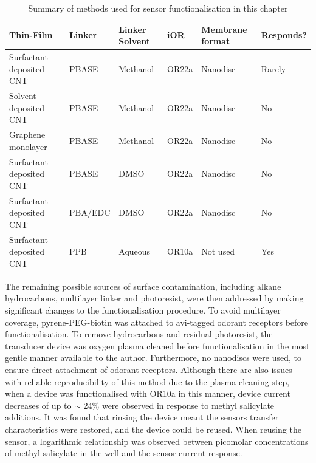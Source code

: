 \documentclass[
  a4paper,
]{scrbook}
\begin{document}
\hypertarget{tbl-method-summary}{}
\begin{longtable}[t]{>{\raggedright\arraybackslash}p{4.5cm}>{\raggedright\arraybackslash}p{1.6cm}>{\raggedright\arraybackslash}p{1.6cm}>{\raggedright\arraybackslash}p{1cm}>{\raggedright\arraybackslash}p{1.5cm}l}
\caption{\label{tbl-method-summary}Summary of methods used for sensor functionalisation in this chapter }\tabularnewline

\toprule
Thin-Film & Linker & Linker Solvent & iOR & Membrane format & Responds?\\
\midrule
Surfactant-deposited CNT & PBASE & Methanol & OR22a & Nanodisc & Rarely\\
Solvent-deposited CNT & PBASE & Methanol & OR22a & Nanodisc & No\\
Graphene monolayer & PBASE & Methanol & OR22a & Nanodisc & No\\
Surfactant-deposited CNT & PBASE & DMSO & OR22a & Nanodisc & No\\
Surfactant-deposited CNT & PBA/EDC & DMSO & OR22a & Nanodisc & No\\
\addlinespace
Surfactant-deposited CNT & PPB & Aqueous & OR10a & Not used & Yes\\
\bottomrule
\end{longtable}

The remaining possible sources of surface contamination, including
alkane hydrocarbons, multilayer linker and photoresist, were then
addressed by making significant changes to the functionalisation
procedure. To avoid multilayer coverage, pyrene-PEG-biotin was attached
to avi-tagged odorant receptors before functionalisation. To remove
hydrocarbons and residual photoresist, the transducer device was oxygen
plasma cleaned before functionalisation in the most gentle manner
available to the author. Furthermore, no nanodiscs were used, to ensure
direct attachment of odorant receptors. Although there are also issues
with reliable reproducibility of this method due to the plasma cleaning
step, when a device was functionalised with OR10a in this manner, device
current decreases of up to \(\sim\) 24\% were observed in response to
methyl salicylate additions. It was found that rinsing the device meant
the sensors transfer characteristics were restored, and the device could
be reused. When reusing the sensor, a logarithmic relationship was
observed between picomolar concentrations of methyl salicylate in the
well and the sensor current response.

\cleardoublepage
{}
{}
\appendix
\end{document}
